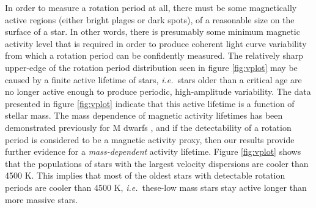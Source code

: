 \documentclass{aastex63}
\newcommand{\ie}{{\it i.e.}}
\newcommand{\eg}{{\it e.g.}}
\newcommand{\kepler}{{\it Kepler}}
\newcommand{\racomment}[1]{{\color{blue}#1}}
\begin{document}
\racomment{
In order to measure a rotation period at all, there must be some magnetically
active regions (either bright plages or dark spots), of a reasonable size on
the surface of a star.
In other words, there is presumably some minimum magnetic activity level that
is required in order to produce coherent light curve variability from which a
rotation period can be confidently measured.
The relatively sharp upper-edge of the rotation period distribution seen in
figure \ref{fig:vplot} may be caused by a finite active lifetime of stars,
\ie\ stars older than a critical age are no longer active enough to produce
periodic, high-amplitude variability.
The data presented in figure \ref{fig:vplot} indicate that this active
lifetime is a function of stellar mass.
The mass dependence of magnetic activity lifetimes has been demonstrated
previously \racomment{for M dwarfs} \citep[\eg][]{west2008, newton2017,
kiman2019}, and if the detectability of a rotation period is considered to be
a magnetic activity proxy, then our results provide further evidence for a
{\it mass-dependent} activity lifetime.
Figure \ref{fig:vplot} shows that the populations of stars with the largest
velocity dispersions are cooler than 4500 K.
This implies that \racomment{most of} the oldest stars with detectable
rotation periods are cooler than 4500 K, \ie\ these-low mass stars stay active
longer than more massive stars.
}
\end{document}
